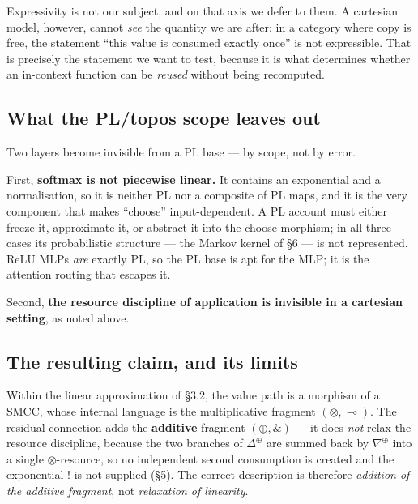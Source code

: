 \documentclass[a4paper,11pt]{article}
\begin{document}
Expressivity is not our subject, and on that axis we defer to them. A
cartesian model, however, cannot \emph{see} the quantity we are after:
in a category where copy is free, the statement ``this value is consumed
exactly once'' is not expressible. That is precisely the statement we
want to test, because it is what determines whether an in-context
function can be \emph{reused} without being recomputed.

\hypertarget{what-the-pltopos-scope-leaves-out}{%
\subsection{What the PL/topos scope leaves
out}\label{what-the-pltopos-scope-leaves-out}}

Two layers become invisible from a PL base --- by scope, not by error.

First, \textbf{softmax is not piecewise linear.} It contains an
exponential and a normalisation, so it is neither PL nor a composite of
PL maps, and it is the very component that makes ``choose''
input-dependent. A PL account must either freeze it, approximate it, or
abstract it into the choose morphism; in all three cases its
probabilistic structure --- the Markov kernel of §6 --- is not
represented. ReLU MLPs \emph{are} exactly PL, so the PL base is apt for
the MLP; it is the attention routing that escapes it.

Second, \textbf{the resource discipline of application is invisible in a
cartesian setting}, as noted above.

\hypertarget{the-resulting-claim-and-its-limits}{%
\subsection{The resulting claim, and its
limits}\label{the-resulting-claim-and-its-limits}}

Within the linear approximation of §3.2, the value path is a morphism of
a SMCC, whose internal language is the multiplicative fragment
\((\otimes,\multimap)\). The residual connection adds the
\textbf{additive} fragment \((\oplus,\&)\) --- it does \emph{not} relax
the resource discipline, because the two branches of \(\Delta^{\oplus}\)
are summed back by \(\nabla^{\oplus}\) into a single
\(\otimes\)-resource, so no independent second consumption is created
and the exponential \(!\) is not supplied (§5). The correct description
is therefore \emph{addition of the additive fragment}, not
\emph{relaxation of linearity}.
\end{document}
